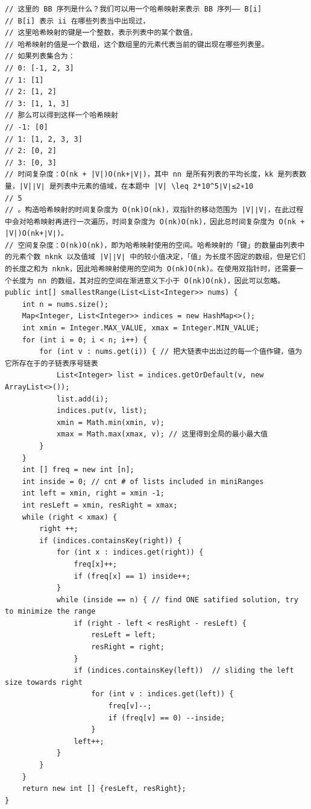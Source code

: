\documentclass[9pt, b5paaper]{book}
\begin{document}
\begin{verbatim}
// 这里的 BB 序列是什么？我们可以用一个哈希映射来表示 BB 序列—— B[i]
// B[i] 表示 ii 在哪些列表当中出现过，
// 这里哈希映射的键是一个整数，表示列表中的某个数值，
// 哈希映射的值是一个数组，这个数组里的元素代表当前的键出现在哪些列表里。
// 如果列表集合为：
// 0: [-1, 2, 3]
// 1: [1]
// 2: [1, 2]
// 3: [1, 1, 3]
// 那么可以得到这样一个哈希映射
// -1: [0]
// 1: [1, 2, 3, 3]
// 2: [0, 2]
// 3: [0, 3]
// 时间复杂度：O(nk + |V|)O(nk+∣V∣)，其中 nn 是所有列表的平均长度，kk 是列表数量，|V|∣V∣ 是列表中元素的值域，在本题中 |V| \leq 2*10^5∣V∣≤2∗10 
// 5
// 。构造哈希映射的时间复杂度为 O(nk)O(nk)，双指针的移动范围为 |V|∣V∣，在此过程中会对哈希映射再进行一次遍历，时间复杂度为 O(nk)O(nk)，因此总时间复杂度为 O(nk + |V|)O(nk+∣V∣)。
// 空间复杂度：O(nk)O(nk)，即为哈希映射使用的空间。哈希映射的「键」的数量由列表中的元素个数 nknk 以及值域 |V|∣V∣ 中的较小值决定，「值」为长度不固定的数组，但是它们的长度之和为 nknk，因此哈希映射使用的空间为 O(nk)O(nk)。在使用双指针时，还需要一个长度为 nn 的数组，其对应的空间在渐进意义下小于 O(nk)O(nk)，因此可以忽略。
public int[] smallestRange(List<List<Integer>> nums) {
    int n = nums.size();
    Map<Integer, List<Integer>> indices = new HashMap<>();
    int xmin = Integer.MAX_VALUE, xmax = Integer.MIN_VALUE;
    for (int i = 0; i < n; i++) {
        for (int v : nums.get(i)) { // 把大链表中出出过的每一个值作键，值为它所存在于的子链表序号链表
            List<Integer> list = indices.getOrDefault(v, new ArrayList<>());
            list.add(i);
            indices.put(v, list);
            xmin = Math.min(xmin, v);
            xmax = Math.max(xmax, v); // 这里得到全局的最小最大值
        }
    }
    int [] freq = new int [n];
    int inside = 0; // cnt # of lists included in miniRanges
    int left = xmin, right = xmin -1;
    int resLeft = xmin, resRight = xmax;
    while (right < xmax) {
        right ++;
        if (indices.containsKey(right)) {
            for (int x : indices.get(right)) {
                freq[x]++;
                if (freq[x] == 1) inside++;
            }
            while (inside == n) { // find ONE satified solution, try to minimize the range
                if (right - left < resRight - resLeft) {
                    resLeft = left;
                    resRight = right;
                }
                if (indices.containsKey(left))  // sliding the left size towards right
                    for (int v : indices.get(left)) {
                        freq[v]--;
                        if (freq[v] == 0) --inside;
                    }
                left++;
            }
        }
    }
    return new int [] {resLeft, resRight};
}
\end{verbatim}
\end{document}
